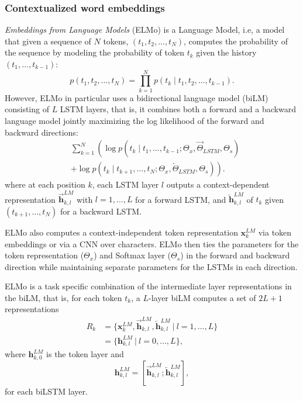 
\subsubsection{Contextualized word embeddings}

\emph{Embeddings from Language Models} (ELMo) \cite{peters-etal-2018-deep} is a Language Model, i.e, a model that given a sequence of $N$ tokens, $(t_1, t_2, ..., t_N)$, computes the probability of the sequence
by modeling the probability of token $t_k$ given the history $(t_1, ..., t_{k-1})$:
\[
    p(t_1, t_2, \ldots, t_N) = \prod_{k=1}^N p({t_k} \mid t_1, t_2, \ldots, t_{k-1}).
\]
However, ELMo in particular uses a bidirectional language model (biLM) consisting of $L$ LSTM layers, that is, it combines both a forward and a backward language model jointly maximizing the log likelihood of the forward and backward directions:
\begin{align*}
     & \sum_{k=1}^N \left( \right. \log p({t_k} \mid t_1, \ldots, t_{k-1}; \Theta_x, \overrightarrow{\Theta}_{LSTM}, \Theta_s) \\
     & + \log p({t_k} \mid t_{k+1}, \ldots, t_{N}; \Theta_x, \overleftarrow{\Theta}_{LSTM}, \Theta_s)
    \left. \right).
\end{align*}
where at each position $k$, each LSTM layer $l$ outputs a context-dependent representation $\overrightarrow{\mathbf{h}}^{LM}_{k,l}$ with $l=1, \ldots, L$ for a forward LSTM, and $\overleftarrow{\mathbf{h}}^{LM}_{k,l}$ of $t_k$ given $(t_{k+1}, \ldots, t_N)$ for a backward LSTM.

ELMo also computes a context-independent token representation $\mathbf{x}^{LM}_{k}$ via token embeddings or via a CNN over characters. ELMo then ties the parameters for the token representation ($\Theta_x$) and Softmax layer ($\Theta_s$) in the forward and backward direction while maintaining separate parameters for the LSTMs in each direction.

ELMo is a task specific combination of the intermediate layer representations in the biLM, that is,
for each token $t_k$, a $L$-layer biLM computes a set of $2L + 1$ representations
\begin{align*}
    R_k & =  \{\mathbf{x}^{LM}_{k}, \overrightarrow{\mathbf{h}}^{LM}_{k,l}, \overleftarrow{\mathbf{h}}^{LM}_{k,l} \ |\  l =1, \ldots, L \} \\
        & =  \{\mathbf{h}^{LM}_{k,l}\ | \ l=0, \ldots, L\},
\end{align*}
where $\mathbf{h}^{LM}_{k,0}$ is the token layer and
\[
    \mathbf{h}^{LM}_{k,l} = [\overrightarrow{\mathbf{h}}^{LM}_{k,l}; \overleftarrow{\mathbf{h}}^{LM}_{k,l}],
\]
for each biLSTM layer.


